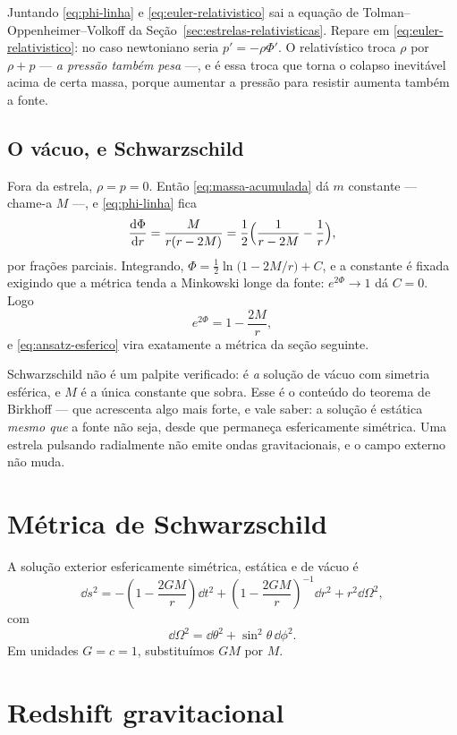 \documentclass[12pt,a4paper,oneside]{book}
\theoremstyle{rgplain}
\theoremstyle{rgremark}
\begin{document}
Juntando \eqref{eq:phi-linha} e \eqref{eq:euler-relativistico} sai a equação
de Tolman--Oppenheimer--Volkoff da Seção~\ref{sec:estrelas-relativisticas}.
Repare em \eqref{eq:euler-relativistico}: no caso newtoniano seria
$p'=-\rho\Phi'$. O relativístico troca $\rho$ por $\rho+p$ --- \emph{a
pressão também pesa} ---, e é essa troca que torna o colapso inevitável
acima de certa massa, porque aumentar a pressão para resistir aumenta
também a fonte.

\subsection*{O vácuo, e Schwarzschild}

Fora da estrela, $\rho=p=0$. Então \eqref{eq:massa-acumulada} dá $m$
constante --- chame-a $M$ ---, e \eqref{eq:phi-linha} fica
\[
  \frac{\mathrm{d}\Phi}{\mathrm{d} r}=\frac{M}{r(r-2M)}
  =\frac12\Bigl(\frac{1}{r-2M}-\frac1r\Bigr) ,
\]
por frações parciais. Integrando,
$\Phi=\tfrac12\ln\bigl(1-2M/r\bigr)+C$, e a constante é fixada exigindo que a
métrica tenda a Minkowski longe da fonte: $e^{2\Phi}\to1$ dá $C=0$. Logo
\begin{equation}
  e^{2\Phi}=1-\frac{2M}{r} ,
  \label{eq:schwarzschild-deduzida}
\end{equation}
e \eqref{eq:ansatz-esferico} vira exatamente a métrica da seção seguinte.

\begin{central}
Schwarzschild não é um palpite verificado: é \emph{a} solução de vácuo com
simetria esférica, e $M$ é a única constante que sobra. Esse é o conteúdo do
teorema de Birkhoff --- que acrescenta algo mais forte, e vale saber: a
solução é estática \emph{mesmo que} a fonte não seja, desde que permaneça
esfericamente simétrica. Uma estrela pulsando radialmente não emite ondas
gravitacionais, e o campo externo não muda.
\end{central}

\section{Métrica de Schwarzschild}

A solução exterior esfericamente simétrica, estática e de vácuo é
\[
  \dd s^2=
  -\left(1-\frac{2GM}{r}\right)\dd t^2
  +\left(1-\frac{2GM}{r}\right)^{-1}\dd r^2
  +r^2\dd\Omega^2,
\]
com
\[
  \dd\Omega^2=\dd\theta^2+\sin^2\theta\,\dd\phi^2.
\]
Em unidades $G=c=1$, substituímos $GM$ por $M$.

\section{Redshift gravitacional}
\label{sec:redshift-grav}
\end{document}
